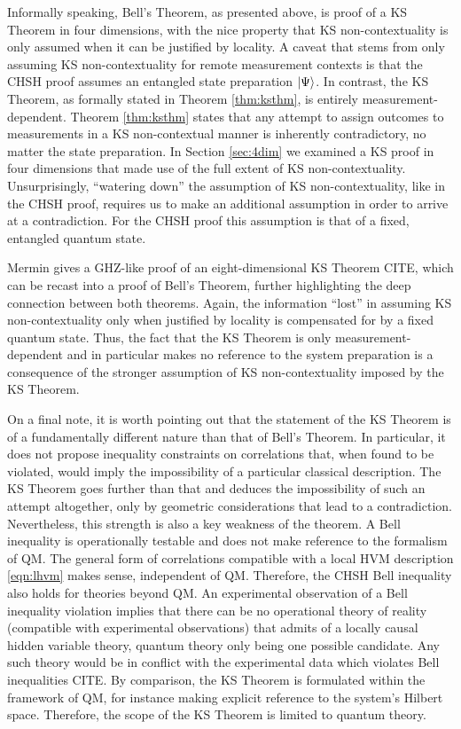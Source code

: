 Informally speaking, Bell's Theorem, as presented above, is proof of a KS Theorem in four dimensions, with the nice property that KS non-contextuality is only assumed when it can be justified by locality. A caveat that stems from only assuming KS non-contextuality for remote measurement contexts is that the CHSH proof assumes an entangled state preparation $\ket{\Psi}$. In contrast, the KS Theorem, as formally stated in Theorem \ref{thm:ksthm}, is entirely measurement-dependent. Theorem \ref{thm:ksthm} states that any attempt to assign outcomes to measurements in a KS non-contextual manner is inherently contradictory, no matter the state preparation. In Section \ref{sec:4dim} we examined a KS proof in four dimensions that made use of the full extent of KS non-contextuality. Unsurprisingly, “watering down” the assumption of KS non-contextuality, like in the CHSH proof, requires us to make an additional assumption in order to arrive at a contradiction. For the CHSH proof this assumption is that of a fixed, entangled quantum state. 

Mermin gives a GHZ-like proof of an eight-dimensional KS Theorem CITE, which can be recast into a proof of Bell's Theorem, further highlighting the deep connection between both theorems. Again, the information “lost” in assuming KS non-contextuality only when justified by locality is compensated for by a fixed quantum state. Thus, the fact that the KS Theorem is only measurement-dependent and in particular makes no reference to the system preparation is a consequence of the stronger assumption of KS non-contextuality imposed by the KS Theorem.

On a final note, it is worth pointing out that the statement of the KS Theorem is of a fundamentally different nature than that of Bell's Theorem. In particular, it does not propose inequality constraints on correlations that, when found to be violated, would imply the impossibility of a particular classical description. The KS Theorem goes further than that and deduces the impossibility of such an attempt altogether, only by geometric considerations that lead to a contradiction. Nevertheless, this strength is also a key weakness of the theorem. A Bell inequality is operationally testable and does not make reference to the formalism of QM. The general form of correlations compatible with a local HVM description \ref{eqn:lhvm} makes sense, independent of QM. Therefore, the CHSH Bell inequality also holds for theories beyond QM. An experimental observation of a Bell inequality violation implies that there can be no operational theory of reality (compatible with experimental observations) that admits of a locally causal hidden variable theory, quantum theory only being one possible candidate. Any such theory would be in conflict with the experimental data which violates Bell inequalities CITE. By comparison, the KS Theorem is formulated within the framework of QM, for instance making explicit reference to the system's Hilbert space. Therefore, the scope of the KS Theorem is limited to quantum theory. 

